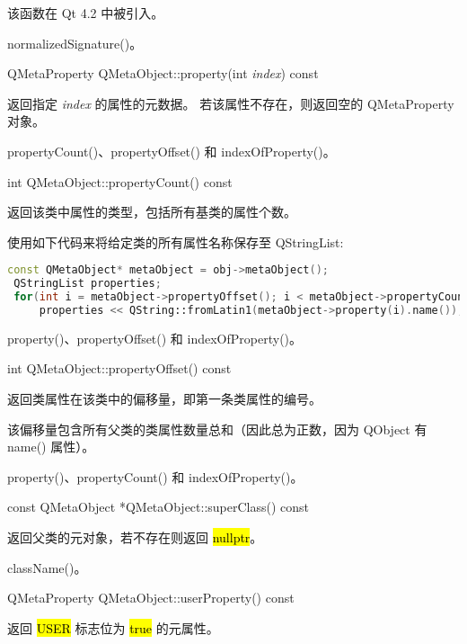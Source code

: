 
该函数在 Qt 4.2 中被引入。

\begin{notice}[另请参阅]
normalizedSignature()。
\end{notice}

QMetaProperty QMetaObject::property(int \emph{index}) const

返回指定 \emph{index} 的属性的元数据。
若该属性不存在，则返回空的 QMetaProperty 对象。

\begin{notice}[另请参阅]
propertyCount()、propertyOffset() 和 indexOfProperty()。
\end{notice}

int QMetaObject::propertyCount() const

返回该类中属性的类型，包括所有基类的属性个数。

使用如下代码来将给定类的所有属性名称保存至 QStringList: 

\begin{lstlisting}[language=C++]
 const QMetaObject* metaObject = obj->metaObject();
 QStringList properties;
 for(int i = metaObject->propertyOffset(); i < metaObject->propertyCount(); ++i)
     properties << QString::fromLatin1(metaObject->property(i).name());
\end{lstlisting}

\begin{notice}[另请参阅]
property()、propertyOffset() 和 indexOfProperty()。
\end{notice}

int QMetaObject::propertyOffset() const

返回类属性在该类中的偏移量，即第一条类属性的编号。

该偏移量包含所有父类的类属性数量总和（因此总为正数，因为 QObject 有 name() 属性）。

\begin{notice}[另请参阅]
property()、propertyCount() 和 indexOfProperty()。
\end{notice}

const QMetaObject *QMetaObject::superClass() const

返回父类的元对象，若不存在则返回 \hl{nullptr}。

\begin{notice}[另请参阅]
className()。
\end{notice}

QMetaProperty QMetaObject::userProperty() const

返回 \hl{USER} 标志位为 \hl{true} 的元属性。

